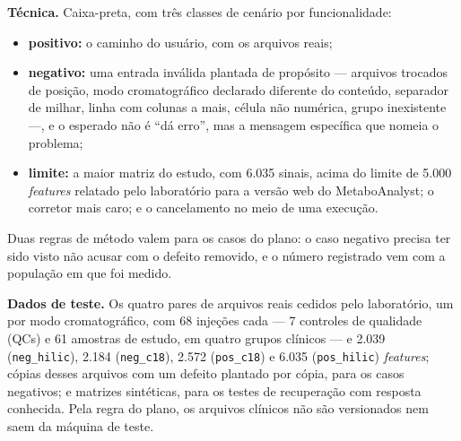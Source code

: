 \textbf{Técnica.} Caixa-preta, com três classes de cenário por funcionalidade:

\begin{itemize}
\item \textbf{positivo:} o caminho do usuário, com os arquivos reais;
\item \textbf{negativo:} uma entrada inválida plantada de propósito --- arquivos trocados de posição, modo cromatográfico declarado diferente do conteúdo, separador de milhar, linha com colunas a mais, célula não numérica, grupo inexistente ---, e o esperado não é ``dá erro'', mas a mensagem específica que nomeia o problema;
\item \textbf{limite:} a maior matriz do estudo, com 6.035 sinais, acima do limite de 5.000 \textit{features} relatado pelo laboratório para a versão web do MetaboAnalyst; o corretor mais caro; e o cancelamento no meio de uma execução.
\end{itemize}

Duas regras de método valem para os casos do plano: o caso negativo precisa ter sido visto não acusar com o defeito removido, e o número registrado vem com a população em que foi medido.


\textbf{Dados de teste.} Os quatro pares de arquivos reais cedidos pelo laboratório, um por modo cromatográfico, com 68 injeções cada --- 7 controles de qualidade (QCs) e 61 amostras de estudo, em quatro grupos clínicos --- e 2.039 (\texttt{neg\_\allowbreak{}hilic}), 2.184 (\texttt{neg\_\allowbreak{}c18}), 2.572 (\texttt{pos\_\allowbreak{}c18}) e 6.035 (\texttt{pos\_\allowbreak{}hilic}) \textit{features}; cópias desses arquivos com um defeito plantado por cópia, para os casos negativos; e matrizes sintéticas, para os testes de recuperação com resposta conhecida. Pela regra do plano, os arquivos clínicos não são versionados nem saem da máquina de teste.


